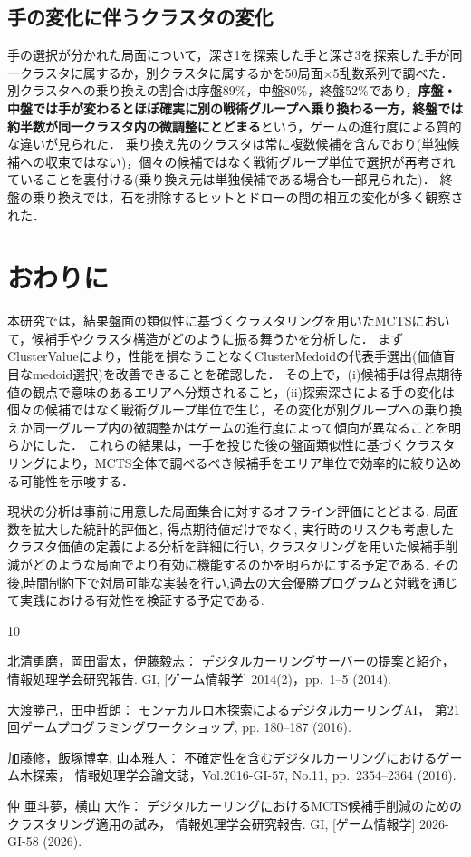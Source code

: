 \documentclass[submit,techrep,noauthor]{ipsj}
\begin{document}
\subsection{手の変化に伴うクラスタの変化}
手の選択が分かれた局面について，深さ1を探索した手と深さ3を探索した手が同一クラスタに属するか，別クラスタに属するかを50局面$\times$5乱数系列で調べた．
別クラスタへの乗り換えの割合は序盤89\%，中盤80\%，終盤52\%であり，\textbf{序盤・中盤では手が変わるとほぼ確実に別の戦術グループへ乗り換わる一方，終盤では約半数が同一クラスタ内の微調整にとどまる}という，ゲームの進行度による質的な違いが見られた．
乗り換え先のクラスタは常に複数候補を含んでおり(単独候補への収束ではない)，個々の候補ではなく戦術グループ単位で選択が再考されていることを裏付ける(乗り換え元は単独候補である場合も一部見られた)．
終盤の乗り換えでは，石を排除するヒットとドローの間の相互の変化が多く観察された．


\section{おわりに}

本研究では，結果盤面の類似性に基づくクラスタリングを用いたMCTSにおいて，候補手やクラスタ構造がどのように振る舞うかを分析した．
まずClusterValueにより，性能を損なうことなくClusterMedoidの代表手選出(価値盲目なmedoid選択)を改善できることを確認した．
その上で，(i)候補手は得点期待値の観点で意味のあるエリアへ分類されること，(ii)探索深さによる手の変化は個々の候補ではなく戦術グループ単位で生じ，その変化が別グループへの乗り換えか同一グループ内の微調整かはゲームの進行度によって傾向が異なることを明らかにした．
これらの結果は，一手を投じた後の盤面類似性に基づくクラスタリングにより，MCTS全体で調べるべき候補手をエリア単位で効率的に絞り込める可能性を示唆する．

現状の分析は事前に用意した局面集合に対するオフライン評価にとどまる. 局面数を拡大した統計的評価と, 得点期待値だけでなく, 実行時のリスクも考慮したクラスタ価値の定義による分析を詳細に行い, クラスタリングを用いた候補手削減がどのような局面でより有効に機能するのかを明らかにする予定である.
その後,時間制約下で対局可能な実装を行い,過去の大会優勝プログラムと対戦を通じて実践における有効性を検証する予定である.

\begin{thebibliography}{10}

北清勇磨，岡田雷太，伊藤毅志：
デジタルカーリングサーバーの提案と紹介，
情報処理学会研究報告. GI, [ゲーム情報学] 2014(2)，pp.~1--5 (2014).

大渡勝己，田中哲朗：
モンテカルロ木探索によるデジタルカーリングAI，
第21回ゲームプログラミングワークショップ, pp. 180--187 (2016).

加藤修，飯塚博幸, 山本雅人：
不確定性を含むデジタルカーリングにおけるゲーム木探索，
情報処理学会論文誌，Vol.2016-GI-57, No.11, pp.~2354--2364 (2016).

仲 亜斗夢，横山 大作：
デジタルカーリングにおけるMCTS候補手削減のためのクラスタリング適用の試み，
情報処理学会研究報告. GI, [ゲーム情報学] 2026-GI-58 (2026).

\end{thebibliography}
\end{document}
